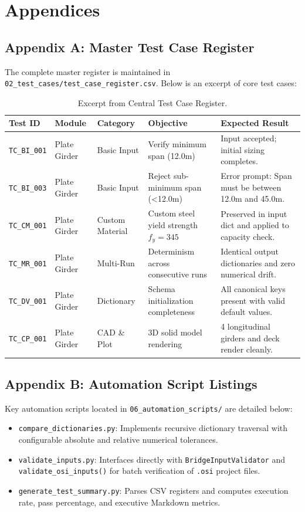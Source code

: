 \chapter{Appendices}
\label{chap:appendices}

\section{Appendix A: Master Test Case Register}
The complete master register is maintained in \texttt{02\_test\_cases/test\_case\_register.csv}. Below is an excerpt of core test cases:

\begin{table}[htbp]
    \centering
    \tiny
    \caption{Excerpt from Central Test Case Register.}
    \label{tab:app_test_cases}
    \begin{tabularx}{\textwidth}{llllX}
        \toprule
        \textbf{Test ID} & \textbf{Module} & \textbf{Category} & \textbf{Objective} & \textbf{Expected Result} \\
        \midrule
        \texttt{TC\_BI\_001} & Plate Girder & Basic Input & Verify minimum span (12.0m) & Input accepted; initial sizing completes. \\
        \texttt{TC\_BI\_003} & Plate Girder & Basic Input & Reject sub-minimum span (<12.0m) & Error prompt: Span must be between 12.0m and 45.0m. \\
        \texttt{TC\_CM\_001} & Plate Girder & Custom Material & Custom steel yield strength $f_y=345$ & Preserved in input dict and applied to capacity check. \\
        \texttt{TC\_MR\_001} & Plate Girder & Multi-Run & Determinism across consecutive runs & Identical output dictionaries and zero numerical drift. \\
        \texttt{TC\_DV\_001} & Plate Girder & Dictionary & Schema initialization completeness & All canonical keys present with valid default values. \\
        \texttt{TC\_CP\_001} & Plate Girder & CAD \& Plot & 3D solid model rendering & 4 longitudinal girders and deck render cleanly. \\
        \bottomrule
    \end{tabularx}
\end{table}

\section{Appendix B: Automation Script Listings}
Key automation scripts located in \texttt{06\_automation\_scripts/} are detailed below:
\begin{itemize}
    \item \texttt{compare\_dictionaries.py}: Implements recursive dictionary traversal with configurable absolute and relative numerical tolerances.
    \item \texttt{validate\_inputs.py}: Interfaces directly with \texttt{BridgeInputValidator} and \texttt{validate\_osi\_inputs()} for batch verification of \texttt{.osi} project files.
    \item \texttt{generate\_test\_summary.py}: Parses CSV registers and computes execution rate, pass percentage, and executive Markdown metrics.
\end{itemize}
